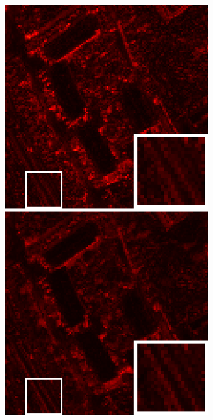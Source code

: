 \begin{figure}[t]
\begin{center}
		\vspace{1mm}
		
		\begin{minipage}{0.15\hsize}
			\centerline{\includegraphics[width=\hsize]{./fig_supplement/SAM_map_color_woboundary/PaviaU120/sam_map_SSTV.eps}} %
		\end{minipage}
		\begin{minipage}{0.15\hsize}
			\centerline{\includegraphics[width=\hsize]{./fig_supplement/SAM_map_color_woboundary/PaviaU120/sam_map_HSSTV_L1.eps}} %

\end{minipage}
\end{center}
\end{figure}
